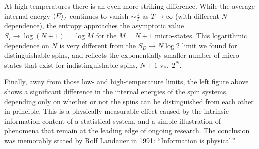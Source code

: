 At high temperatures there is an even more striking difference.
While the average internal energy $\left\langle E \right\rangle_I$ continues to vanish $\sim$$\frac{1}{T}$ as $T \to \infty$ (with different $N$ dependence), the entropy approaches the asymptotic value $S_I \to \log\left(N + 1\right) = \log M$ for the $M = N + 1$ micro-states.
This logarithmic dependence on $N$ is very different from the $S_D \to N\log 2$ limit we found for distinguishable spins, and reflects the exponentially smaller number of micro-states that exist for indistinguishable spins, $N + 1$ vs.\ $2^N$.

Finally, away from those low- and high-temperature limits, the left figure above shows a significant difference in the internal energies of the spin systems, depending only on whether or not the spins can be distinguished from each other in principle.
This is a physically measurable effect caused by the intrinsic information content of a statistical system, and a simple illustration of phenomena that remain at the leading edge of ongoing research.
The conclusion was memorably stated by \href{https://en.wikipedia.org/wiki/Rolf_Landauer}{Rolf Landauer} in 1991: ``Information is physical.''
